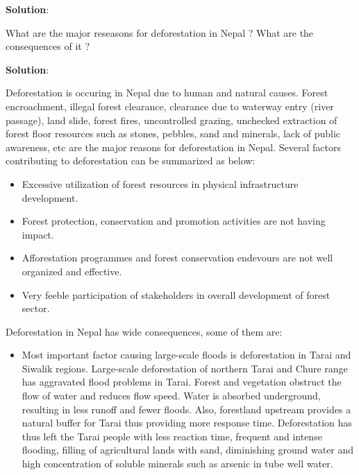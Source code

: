 \documentclass[
  openany]{book}
\newcommand{\question}{\item}
\newenvironment{solution}{ {\bfseries Solution}:}{}
\begin{document}
\begin{questions}
\begin{solution}

\end{solution}

\question What are the major reseasons for deforestation in Nepal ? What are the consequences of it ?

\begin{solution}

Deforestation is occuring in Nepal due to human and natural causes. Forest encroachment, illegal forest clearance, clearance due to waterway entry (river passage), land slide, forest fires, uncontrolled grazing, unchecked extraction of forest floor resources such as stones, pebbles, sand and minerals, lack of public awareness, etc are the major reasons for deforestation in Nepal. Several factors contributing to deforestation can be summarized as below:
\begin{itemize}
\item Excessive utilization of forest resources in physical infrastructure development.
\item Forest protection, conservation and promotion activities are not having impact.
\item Afforestation programmes and forest conservation endevours are not well organized and effective.
\item Very feeble participation of stakeholders in overall development of forest sector.
\end{itemize}

Deforestation in Nepal has wide consequences, some of them are:

\begin{itemize}
\item Most important factor causing large-scale floods is deforestation in Tarai and Siwalik regions. Large-scale deforestation of northern Tarai and Chure range has aggravated flood problems in Tarai. Forest and vegetation obstruct the flow of water and reduces flow speed. Water is absorbed underground, resulting in less runoff and fewer floods. Also, forestland upstream provides a natural buffer for Tarai thus providing more response time. Deforestation has thus left the Tarai people with less reaction time, frequent and intense flooding, filling of agricultural lands with sand, diminishing ground water and high concentration of soluble minerals such as arsenic in tube well water.
\end{itemize}

\end{solution}


\end{questions}
\end{document}

